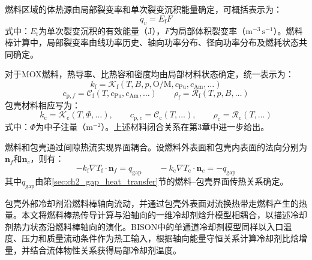 燃料区域的体热源由局部裂变率和单次裂变沉积能量确定，可概括表示为：
\begin{equation}
	\dot q_v=E_{\mathrm f}F
	\label{eq:ch2_fission_heat_source}
\end{equation}
\noindent 式中：$E_{\mathrm f}$为单次裂变沉积的有效能量（$\mathrm{J}$），$F$为局部体积裂变率（$\mathrm{m^{-3}\,s^{-1}}$）。燃料棒计算中，局部裂变率由线功率历史、轴向功率分布、径向功率分布及燃耗状态共同确定。

对于MOX燃料，热导率、比热容和密度均由局部材料状态确定，统一表示为：
\begin{equation}
	k_{\mathrm f}=\mathcal K_{\mathrm f}
	\left(T,B,p,\mathrm{O/M},c_{\mathrm{Pu}},c_{\mathrm{Am}},\ldots\right)
	\label{eq:ch2_fuel_k_closure}
\end{equation}
\begin{equation}
	c_{\mathrm p,f}=\mathcal C_{\mathrm f}
	\left(T,c_{\mathrm{Pu}},c_{\mathrm{Am}},\ldots\right)
	\qquad
	\rho_{\mathrm f}=\mathcal R_{\mathrm f}\left(T,p,B,\ldots\right)
	\label{eq:ch2_fuel_cp_rho_closure}
\end{equation}
包壳材料相应写为：
\begin{equation}
	k_{\mathrm c}=\mathcal K_{\mathrm c}(T,\varPhi,\ldots),\qquad
	c_{\mathrm p,c}=\mathcal C_{\mathrm c}(T,\ldots),\qquad
	\rho_{\mathrm c}=\mathcal R_{\mathrm c}(T,\ldots)
	\label{eq:ch2_clad_thermal_closure}
\end{equation}
\noindent 式中：$\varPhi$为中子注量（$\mathrm{m^{-2}}$）。上述材料闭合关系在第3章中进一步给出。

燃料和包壳通过间隙热流实现界面耦合。设燃料外表面和包壳内表面的法向分别为$\mathbf n_f$和$\mathbf n_c$，则有：
\begin{equation}
	-k_{\mathrm f}\nabla T_{\mathrm f}\cdot\mathbf n_f=q_{\mathrm{gap}}
	\qquad
	-k_{\mathrm c}\nabla T_{\mathrm c}\cdot\mathbf n_c=-q_{\mathrm{gap}}
	\label{eq:ch2_gap_flux_continuity}
\end{equation}
其中$q_{\mathrm{gap}}$由第\ref{sec:ch2_gap_heat_transfer}节的燃料--包壳界面传热关系确定。

\label{subsec:ch2_coolant_enthalpy}

包壳外部冷却剂沿燃料棒轴向流动，并通过包壳外表面对流换热带走燃料产生的热量。本文将燃料棒热传导计算与沿轴向的一维冷却剂{\rarecharfont 焓}升模型相耦合，以描述冷却剂热力状态沿燃料棒轴向的演化。BISON中的单通道冷却剂模型同样以入口温度、压力和质量流动条件作为热工输入，根据轴向能量守恒关系计算冷却剂比{\rarecharfont 焓}增量，并结合流体物性关系获得局部冷却剂温度\cite{halesBISONTheoryManual2016}。


